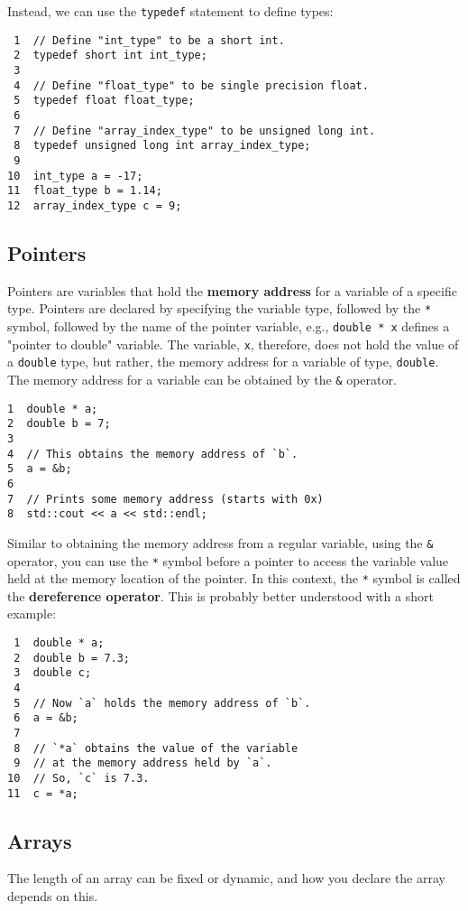 \documentclass[11pt]{article}
\begin{document}
Instead, we can use the \texttt{typedef} statement to define types:

\begin{verbatim}
 1  // Define "int_type" to be a short int.
 2  typedef short int int_type;
 3  
 4  // Define "float_type" to be single precision float.
 5  typedef float float_type;
 6  
 7  // Define "array_index_type" to be unsigned long int.
 8  typedef unsigned long int array_index_type;
 9  
10  int_type a = -17; 
11  float_type b = 1.14; 
12  array_index_type c = 9;
\end{verbatim}

\subsection{Pointers}
\label{sec-3-7}
Pointers are variables that hold the \textbf{memory address} for a variable 
of a specific type. Pointers are declared by specifying the variable 
type, followed by the \texttt{*} symbol, followed by the name of the pointer 
variable, e.g., \texttt{double * x} defines a "pointer to double" variable. 
The variable, \texttt{x}, therefore, does not hold the value of a \texttt{double} 
type, but rather, the memory address for a variable of type, \texttt{double}.
The memory address for a variable can be obtained by the \texttt{\&} operator.

\begin{verbatim}
1  double * a;
2  double b = 7;
3  
4  // This obtains the memory address of `b`.
5  a = &b;
6  
7  // Prints some memory address (starts with 0x)
8  std::cout << a << std::endl;
\end{verbatim}

Similar to obtaining the memory address from a regular variable, using the
\texttt{\&} operator, you can use the \texttt{*} symbol before a pointer to access the 
variable value held at the memory location of the pointer. In this context,
the \texttt{*} symbol is called the \textbf{dereference operator}. This is probably better 
understood with a short example:

\begin{verbatim}
 1  double * a;
 2  double b = 7.3;
 3  double c;
 4  
 5  // Now `a` holds the memory address of `b`.
 6  a = &b;
 7  
 8  // `*a` obtains the value of the variable
 9  // at the memory address held by `a`.
10  // So, `c` is 7.3.
11  c = *a;
\end{verbatim}

\subsection{Arrays}
\label{sec-3-8}
The length of an array can be fixed or dynamic, and how you
declare the array depends on this.
\end{document}
